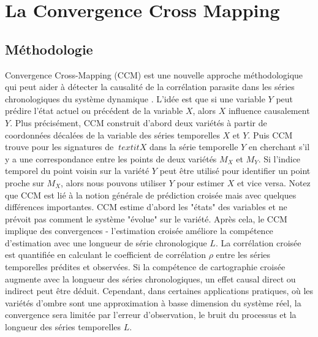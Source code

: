 \chapter{La \mt Convergence Cross Mapping}
\label{chap6}

\section{M\'ethodologie}
Convergence Cross-Mapping (CCM) est une nouvelle approche méthodologique qui peut aider à détecter la causalité de la corrélation parasite dans les séries chronologiques du système dynamique \cite{sugihara2012,tsonis2015,deyle2016}. L'idée est que si une variable $\textit{Y}$ peut prédire l'état actuel ou précédent de la variable $\textit{X}$, alors $\textit{X}$ influence causalement $\textit{Y}$. Plus précisément, CCM construit d'abord deux variétés à partir de coordonnées décalées de la variable des séries temporelles $\textit{X}$ et $\textit{Y}$. Puis CCM trouve pour les signatures de $ \ textit {X} $ dans la série temporelle $\textit{Y}$ en cherchant s'il y a une correspondance entre les points de deux variétés $\textit{M}_X$ et $\textit {M}_Y$. Si l'indice temporel du point voisin sur la variété $\textit{Y}$ peut être utilisé pour identifier un point proche sur $\textit{M} _X$, alors nous pouvons utiliser $\textit{Y}$ pour estimer $\textit{X}$ et vice versa. Notez que CCM est lié à la notion générale de prédiction croisée mais avec quelques différences importantes. CCM estime d'abord les "états" des variables et ne prévoit pas comment le système "évolue" sur le variété. Après cela, le CCM implique des convergences - l'estimation croisée améliore la compétence d'estimation avec une longueur de série chronologique $\textit {L}$. La corrélation croisée est quantifiée en calculant le coefficient de corrélation $\rho$ entre les séries temporelles prédites et observées. Si la compétence de cartographie croisée augmente avec la longueur des séries chronologiques, un effet causal direct ou indirect peut être déduit. Cependant, dans certaines applications pratiques, où les variétés d'ombre sont une approximation à basse dimension du système réel, la convergence sera limitée par l'erreur d'observation, le bruit du processus et la longueur des séries temporelles $\textit{L}$.

\section{\Rs}

